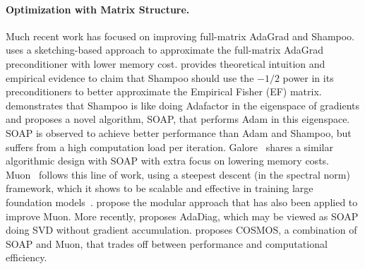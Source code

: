 \documentclass{article}
\theoremstyle{remark}
\begin{document}
\paragraph{Optimization with Matrix Structure.} Much recent work has focused on improving full-matrix AdaGrad and Shampoo. \citet{feinberg2023sketchy} uses a sketching-based approach to approximate the full-matrix AdaGrad preconditioner with lower memory cost. \citet{morwani2024new} provides theoretical intuition and empirical evidence to claim that Shampoo should use the $-1/2$ power in its preconditioners to better approximate the Empirical Fisher (EF) matrix. \citet{vyas2024soap} demonstrates that Shampoo is like doing Adafactor in the eigenspace of gradients and proposes a novel algorithm, SOAP, that performs Adam in this eigenspace. SOAP is observed to achieve better performance than Adam and Shampoo, but suffers from a high computation load per iteration. Galore~\citep{zhao2024galore} shares a similar algorithmic design with SOAP with extra focus on lowering memory costs. Muon~\citep{jordan2024muon} follows this line of work, using a steepest descent (in the spectral norm) framework, which it shows to be scalable and effective in training large foundation models~\citep{liu2025muon}. \citet{large2024scalable,bernstein2024modular} propose the modular approach that has also been applied to improve Muon. More recently, \citet{nguyen2025improving} proposes AdaDiag, which may be viewed as SOAP doing SVD without gradient accumulation. \citet{liu2025cosmos} proposes COSMOS, a combination of SOAP and Muon, that trades off between performance and computational efficiency.
\end{document}
